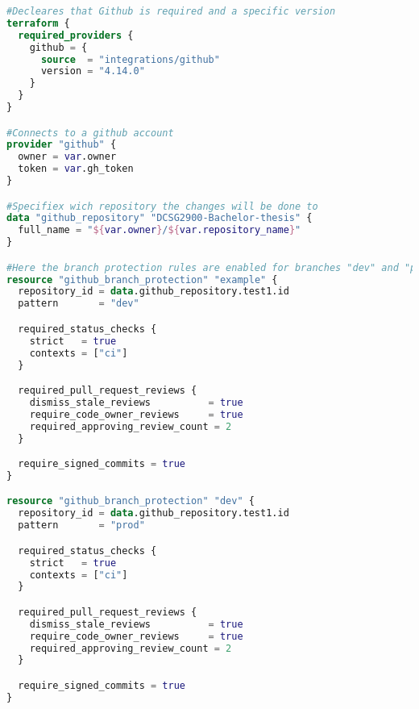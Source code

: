\begin{lstlisting}[language=terraform, caption=Enable branch protection]
#Decleares that Github is required and a specific version
terraform {
  required_providers {
    github = {
      source  = "integrations/github"
      version = "4.14.0"
    }
  }
}

#Connects to a github account 
provider "github" {
  owner = var.owner
  token = var.gh_token
}

#Specifiex wich repository the changes will be done to
data "github_repository" "DCSG2900-Bachelor-thesis" {
  full_name = "${var.owner}/${var.repository_name}"
}

#Here the branch protection rules are enabled for branches "dev" and "prod"
resource "github_branch_protection" "example" {
  repository_id = data.github_repository.test1.id
  pattern       = "dev"

  required_status_checks {
    strict   = true
    contexts = ["ci"]
  }

  required_pull_request_reviews {
    dismiss_stale_reviews          = true
    require_code_owner_reviews     = true
    required_approving_review_count = 2
  }

  require_signed_commits = true
}

resource "github_branch_protection" "dev" {
  repository_id = data.github_repository.test1.id
  pattern       = "prod"

  required_status_checks {
    strict   = true
    contexts = ["ci"]
  }

  required_pull_request_reviews {
    dismiss_stale_reviews          = true
    require_code_owner_reviews     = true
    required_approving_review_count = 2
  }

  require_signed_commits = true
}
\end{lstlisting}